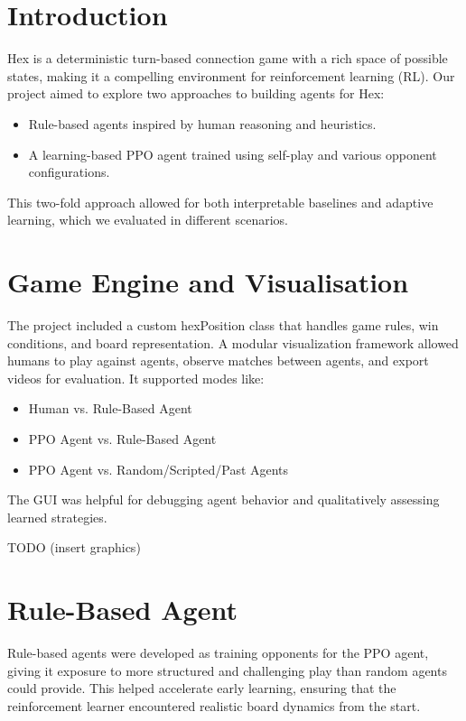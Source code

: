 \documentclass[conference]{IEEEtran}
\begin{document}
\section{Introduction}
Hex is a deterministic turn-based connection game with a rich space of possible states, making it a compelling environment for reinforcement learning (RL). Our project aimed to explore two approaches to building agents for Hex:
\begin{itemize}[]
\item Rule-based agents inspired by human reasoning and heuristics.
\item A learning-based PPO agent trained using self-play and various opponent configurations.
\end{itemize}
This two-fold approach allowed for both interpretable baselines and adaptive learning, which we evaluated in different scenarios. 

\section{Game Engine and Visualisation}

The project included a custom hexPosition class that handles game rules, win conditions, and board representation. A modular visualization framework allowed humans to play against agents, observe matches between agents, and export videos for evaluation. It supported modes like:
\begin{itemize}[]
\item Human vs. Rule-Based Agent
\item PPO Agent vs. Rule-Based Agent
\item PPO Agent vs. Random/Scripted/Past Agents
\end{itemize}
The GUI was helpful for debugging agent behavior and qualitatively assessing learned strategies.

TODO (insert graphics)

\section{Rule-Based Agent}
Rule-based agents were developed as training opponents for the PPO agent, giving it exposure to more structured and challenging play than random agents could provide. This helped accelerate early learning, ensuring that the reinforcement learner encountered realistic board dynamics from the start.
\end{document}
